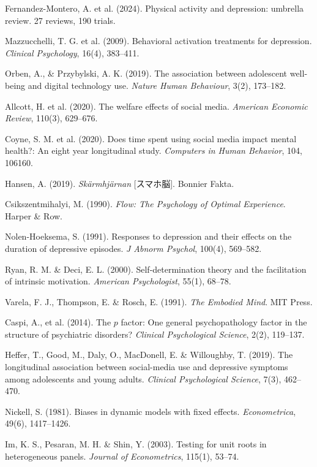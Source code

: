 \documentclass[a4paper,11pt,titlepage]{article}
\begin{document}
\begin{small}
\begin{enumerate}[label={[\arabic*]}, leftmargin=2em, itemsep=2pt]
  \item Fernandez-Montero, A. et al. (2024). Physical activity and depression: umbrella review. 27 reviews, 190 trials.
  \item Mazzucchelli, T. G. et al. (2009). Behavioral activation treatments for depression. \textit{Clinical Psychology}, 16(4), 383--411.
  \item Orben, A., \& Przybylski, A. K. (2019). The association between adolescent well-being and digital technology use. \textit{Nature Human Behaviour}, 3(2), 173--182.
  \item Allcott, H. et al. (2020). The welfare effects of social media. \textit{American Economic Review}, 110(3), 629--676.
  \item Coyne, S. M. et al. (2020). Does time spent using social media impact mental health?: An eight year longitudinal study. \textit{Computers in Human Behavior}, 104, 106160.
  \item Hansen, A. (2019). \textit{Sk\"armhj\"arnan} [スマホ脳]. Bonnier Fakta.
  \item Csikszentmihalyi, M. (1990). \textit{Flow: The Psychology of Optimal Experience}. Harper \& Row.
  \item Nolen-Hoeksema, S. (1991). Responses to depression and their effects on the duration of depressive episodes. \textit{J Abnorm Psychol}, 100(4), 569--582.
  \item Ryan, R. M. \& Deci, E. L. (2000). Self-determination theory and the facilitation of intrinsic motivation. \textit{American Psychologist}, 55(1), 68--78.
  \item Varela, F. J., Thompson, E. \& Rosch, E. (1991). \textit{The Embodied Mind}. MIT Press.
  \item Caspi, A., et al. (2014). The $p$ factor: One general psychopathology factor in the structure of psychiatric disorders? \textit{Clinical Psychological Science}, 2(2), 119--137.
  \item Heffer, T., Good, M., Daly, O., MacDonell, E. \& Willoughby, T. (2019). The longitudinal association between social-media use and depressive symptoms among adolescents and young adults. \textit{Clinical Psychological Science}, 7(3), 462--470.
  \item Nickell, S. (1981). Biases in dynamic models with fixed effects. \textit{Econometrica}, 49(6), 1417--1426.
  \item Im, K. S., Pesaran, M. H. \& Shin, Y. (2003). Testing for unit roots in heterogeneous panels. \textit{Journal of Econometrics}, 115(1), 53--74.

\end{enumerate}
\end{small}
\end{document}
